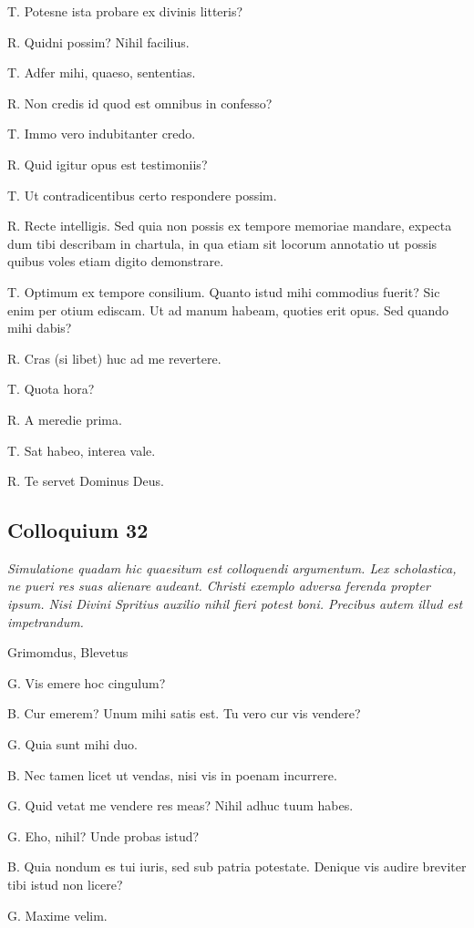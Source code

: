 \documentclass{article}
\begin{document}
T. Potesne ista probare ex divinis litteris?

R. Quidni possim? Nihil facilius.

T. Adfer mihi, quaeso, sententias.

R. Non credis id quod est omnibus in confesso?

T. Immo vero indubitanter credo.

R. Quid igitur opus est testimoniis?

T. Ut contradicentibus certo respondere possim.

R. Recte intelligis. Sed quia non possis ex tempore memoriae mandare, expecta dum tibi describam in chartula, in qua etiam sit locorum annotatio ut possis quibus voles etiam digito demonstrare.

T. Optimum ex tempore consilium. Quanto istud mihi commodius fuerit? Sic enim per otium ediscam. Ut ad manum habeam, quoties erit opus. Sed quando mihi dabis?

R. Cras (si libet) huc ad me revertere.

T. Quota hora?

R. A meredie prima.

T. Sat habeo, interea vale.

R. Te servet Dominus Deus.

\subsection{Colloquium 32}
\emph{Simulatione quadam hic quaesitum est colloquendi argumentum. Lex scholastica, ne pueri res suas alienare audeant. Christi exemplo adversa ferenda propter ipsum. Nisi Divini Spritius auxilio nihil fieri potest boni. Precibus autem illud est impetrandum.}

Grimomdus, Blevetus

G. Vis emere hoc cingulum?

B. Cur emerem? Unum mihi satis est. Tu vero cur vis vendere?

G. Quia sunt mihi duo.

B. Nec tamen licet ut vendas, nisi vis in poenam incurrere.

G. Quid vetat me vendere res meas? Nihil adhuc tuum habes.

G. Eho, nihil? Unde probas istud?

B. Quia nondum es tui iuris, sed sub patria potestate. Denique vis audire breviter tibi istud non licere?

G. Maxime velim.
\end{document}
